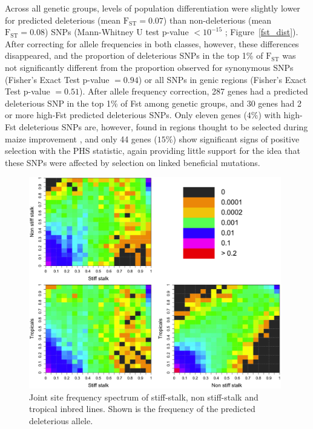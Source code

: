 \documentclass[12pt]{article}
\begin{document}
Across all genetic groups, levels of population differentiation were slightly lower for predicted deleterious (mean $\mathrm{F}_{\mathrm{ST}}=0.07$) than non-deleterious (mean $\mathrm{F}_{\mathrm{ST}}=0.08$) SNPs (Mann-Whitney U test p-value $< 10^{-15}$ ; Figure~\ref{fst_dist}). After correcting 
for allele frequencies in both classes, however, these differences disappeared, and the proportion of deleterious SNPs in the top 1\% of $\mathrm{F}_{\mathrm{ST}}$ was not significantly different from the proportion observed for synonymous SNPs (Fisher's Exact Test p-value $= 0.94$) or all SNPs in genic regions (Fisher's Exact Test p-value $= 0.51$).
After allele frequency correction, 287 genes had a predicted deleterious SNP in the top 1\% of Fst among genetic groups, and 30 genes had 2 or more high-Fst predicted deleterious SNPs.  Only eleven genes ($4\%$) with high-Fst deleterious SNPs  are, however, found in regions thought to be selected during maize improvement  \citep{Hufford2012}, and only 44 genes ($15\%$) show significant signs of positive selection with the PHS statistic, again providing little support for the idea that these SNPs were affected by selection on linked beneficial mutations.

\begin{figure}[!b]
  \begin{center}
   \includegraphics[width=110mm]{joinSFS.png}
    \caption{Joint site frequency spectrum of stiff-stalk, non stiff-stalk and tropical inbred lines. Shown is the frequency of the predicted deleterious allele.}
   \label{jfs}
  \end{center}
\end{figure}
\end{document}
